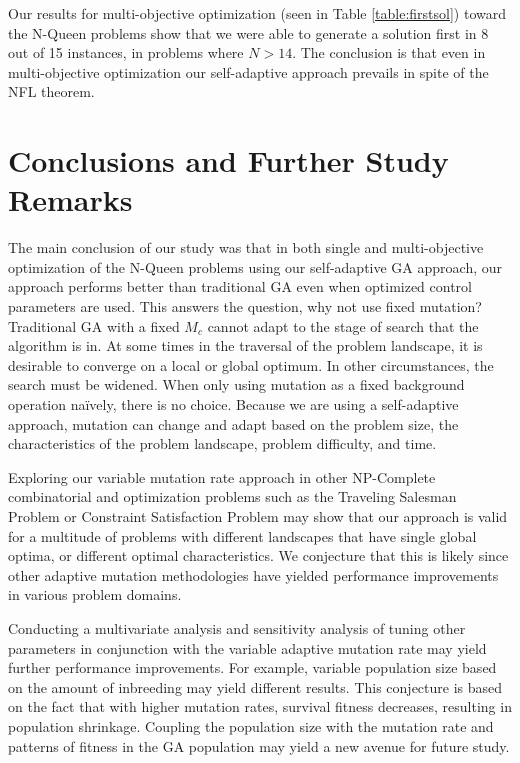 \documentclass[conference]{IEEEtran}
\begin{document}
Our results for multi-objective optimization (seen in Table \ref{table:firstsol}) toward the N-Queen problems show that we were able to generate a solution first in 8 out of 15 instances, in problems where $N > 14$. The conclusion is that even in multi-objective optimization our self-adaptive approach prevails in spite of the NFL theorem.

\section{Conclusions and Further Study Remarks}
The main conclusion of our study was that in both single and multi-objective optimization of the N-Queen problems using our self-adaptive GA approach, our approach performs better than traditional GA even when optimized control parameters are used. This answers the question, why not use fixed mutation? Traditional GA with a fixed $M_{c}$ cannot adapt to the stage of search that the algorithm is in. At some times in the traversal of the problem landscape, it is desirable to converge on a local or global optimum. In other circumstances, the search must be widened. When only using mutation as a fixed background operation na\"{i}vely, there is no choice. Because we are using a self-adaptive approach, mutation can change and adapt based on the problem size, the characteristics of the problem landscape, problem difficulty, and time.

Exploring our variable mutation rate approach in other NP-Complete combinatorial and optimization problems such as the Traveling Salesman Problem or Constraint Satisfaction Problem may show that our approach is valid for a multitude of problems with different landscapes that have single global optima, or different optimal characteristics. We conjecture that this is likely since other adaptive mutation methodologies have yielded performance improvements in various problem domains.

Conducting a multivariate analysis and sensitivity analysis of tuning other parameters in conjunction with the variable adaptive mutation rate may yield further performance improvements. For example, variable population size based on the amount of inbreeding may yield different results. This conjecture is based on the fact that with higher mutation rates, survival fitness decreases, resulting in population shrinkage. Coupling the population size with the mutation rate and patterns of fitness in the GA population may yield a new avenue for future study.


\end{document}
